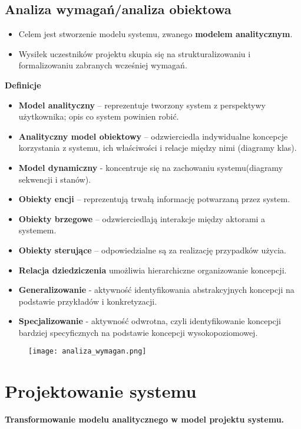 \documentclass[a4paper]{article}
\begin{document}
    \subsection{Analiza wymagań/analiza obiektowa}
    \begin{itemize}
        \item Celem jest stworzenie modelu systemu, zwanego \textbf{modelem analitycznym}.
        \item Wysiłek uczestników projektu skupia się na strukturalizowaniu i formalizowaniu zabranych
        wcześniej wymagań.
    \end{itemize}

    \textbf{Definicje}
    \begin{itemize}
        \item \textbf{Model analityczny} – reprezentuje tworzony system z perspektywy użytkownika; opis co system powinien robić.
        \item \textbf{Analityczny model obiektowy} – odzwierciedla indywidualne koncepcje korzystania z systemu, ich właściwości i relacje między nimi (diagramy klas).
        \item \textbf{Model dynamiczny} - koncentruje się na zachowaniu systemu(diagramy sekwencji i stanów).
        \item \textbf{Obiekty encji} – reprezentują trwałą informację potwarzaną przez system.
        \item \textbf{Obiekty brzegowe} – odzwierciedlają interakcje między aktorami a systemem.
        \item \textbf{Obiekty sterujące} – odpowiedzialne są za realizację przypadków użycia.
        \item \textbf{Relacja dziedziczenia} umożliwia hierarchiczne organizowanie koncepcji.
        \item \textbf{Generalizowanie} - aktywność identyfikowania abstrakcyjnych koncepcji na podstawie przykładów i konkretyzacji.
        \item \textbf{Specjalizowanie} - aktywność odwrotna, czyli identyfikowanie koncepcji bardziej specyficznych na podstawie koncepcji wysokopoziomowej.
    \end{itemize}

    \begin{figure}[h]
        \texttt{[image: analiza\_wymagan.png]}
    \end{figure}

    \section{Projektowanie systemu}
    \textbf{Transformowanie modelu analitycznego w model projektu systemu.}
\end{document}
